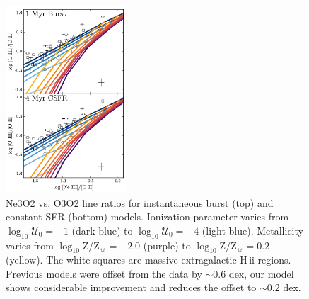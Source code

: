 \documentclass[trackchanges, twocolumn, tighten]{aastex61}
\newcommand{\logten}{\ensuremath{\log_{10}}}
\newcommand{\hii}{H\,{\sc ii}\xspace}
\newcommand{\logZeq}[1]{\ensuremath{\logten \mathrm{Z}/\mathrm{Z}_{\sun} = #1}}
\newcommand{\logU}{\ensuremath{\logten \mathcal{U}_0}}
\begin{document}
\begin{figure}
  \begin{centering}
    \includegraphics[width=0.4\textwidth]{f19.pdf}
    \caption{Ne3O2 vs. O3O2 line ratios for instantaneous burst (top) and constant SFR (bottom) models. Ionization parameter varies from $\logU{}=-1$ (dark blue) to $\logU{}=-4$ (light blue). Metallicity varies from \logZeq{-2.0} (purple) to \logZeq{0.2} (yellow). The white squares are massive extragalactic \hii regions. Previous models were offset from the data by $\sim 0.6$ dex, our model shows considerable improvement and reduces the offset to $\sim 0.2$ dex.}
    \label{fig:NeIII}
  \end{centering}
\end{figure}
\end{document}
